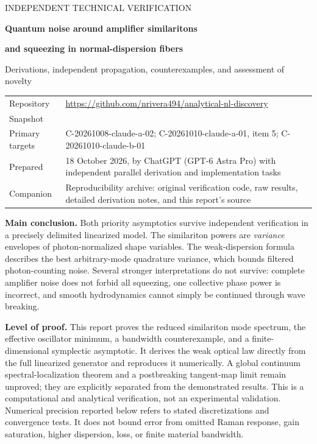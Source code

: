 \documentclass[11pt,a4paper]{article}
\begin{document}
\hypersetup{pageanchor=false}
\begin{titlepage}
\vspace*{12mm}
{\color{blue!45!black}\large INDEPENDENT TECHNICAL VERIFICATION\par}
\vspace{8mm}
{\LARGE\bfseries Quantum noise around amplifier similaritons\par}
\vspace{3mm}
{\LARGE\bfseries and squeezing in normal-dispersion fibers\par}
\vspace{10mm}
{\large Derivations, independent propagation, counterexamples, and assessment of novelty\par}
\vspace{10mm}
\begin{tabularx}{\textwidth}{@{}lY@{}}
Repository & \url{https://github.com/nrivera494/analytical-nl-discovery} \\
Snapshot & \small{} \\
Primary targets & C-20261008-claude-a-02; C-20261010-claude-a-01, item 5; C-20261010-claude-b-01 \\
Prepared & 18 October 2026, by ChatGPT (GPT-6 Astra Pro) with independent parallel derivation and implementation tasks \\
Companion & Reproducibility archive: original verification code, raw results, detailed derivation notes, and this report's source \\
\end{tabularx}
\vspace{10mm}
\textbf{Main conclusion.} Both priority asymptotics survive independent verification in a precisely delimited linearized model. The similariton powers are \emph{variance} envelopes of photon-normalized shape variables. The weak-dispersion formula describes the best arbitrary-mode quadrature variance, which bounds filtered photon-counting noise. Several stronger interpretations do not survive: complete amplifier noise does not forbid all squeezing, one collective phase power is incorrect, and smooth hydrodynamics cannot simply be continued through wave breaking.

\textbf{Level of proof.} This report proves the reduced similariton mode spectrum, the effective oscillator minimum, a bandwidth counterexample, and a finite-dimensional symplectic asymptotic. It derives the weak optical law directly from the full linearized generator and reproduces it numerically. A global continuum spectral-localization theorem and a postbreaking tangent-map limit remain unproved; they are explicitly separated from the demonstrated results.
\vfill
\small This is a computational and analytical verification, not an experimental validation. Numerical precision reported below refers to stated discretizations and convergence tests. It does not bound error from omitted Raman response, gain saturation, higher dispersion, loss, or finite material bandwidth.
\end{titlepage}
\hypersetup{pageanchor=true}
\begingroup
\setlength{\parskip}{0pt}
\small
\tableofcontents
\endgroup
\clearpage
{}
\end{document}
